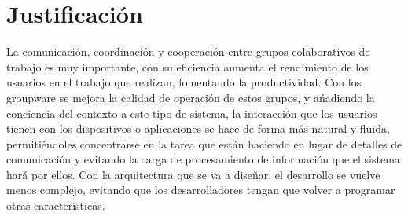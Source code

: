 \section{Justificaci\'on}
La comunicaci\'on, coordinaci\'on y cooperaci\'on entre grupos colaborativos de trabajo es muy importante, con su eficiencia aumenta el rendimiento de los usuarios en el trabajo que realizan, fomentando la productividad. Con los groupware se mejora la calidad de operaci\'on de estos grupos, y a\'nadiendo la conciencia del contexto a este tipo de sistema, la interacci\'on que los usuarios tienen con los dispositivos o aplicaciones se hace de forma m\'as natural y fluida, permiti\'endoles concentrarse en la tarea que est\'an haciendo en lugar de detalles de comunicaci\'on y evitando la carga de procesamiento de informaci\'on que el sistema har\'a por ellos. Con la arquitectura que se va a dise\~nar, el desarrollo se vuelve menos complejo, evitando que los desarrolladores tengan que volver a programar otras  caracter\'isticas.